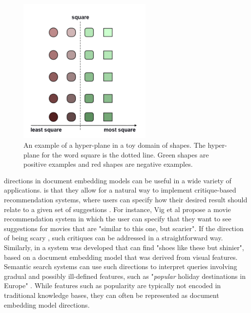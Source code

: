 \begin{figure}[t]
	\includegraphics[width=250px]{images/Toyhyperplane1Direction.png}
	\centering
	\caption{An example of a hyper-plane in a toy domain of shapes. The hyper-plane for the word square is the dotted line. Green shapes are positive examples and red shapes are negative examples. }\label{ch1:introhyp}
\end{figure}

 directions in document embedding models can be useful in a wide variety of applications.   is  that they allow for a natural way to implement critique-based recommendation systems, where users can specify how their desired result should relate to a given set of suggestions \cite{Viappiani2006}. For instance, Vig et al \cite{Vig2014} propose a movie recommendation system in which the user can specify that they want to see suggestions for movies that are "similar to this one, but scarier". If the direction of being scary , such critiques can be addressed in a straightforward way. Similarly, in \cite{Kovashka} a system was developed that can find "shoes like these but shinier", based on a document embedding model that was derived from visual features. Semantic search systems can use such directions to interpret queries involving gradual and possibly ill-defined features, such as "\emph{popular} holiday destinations in Europe" \cite{Jameel}. While features such as popularity are typically not encoded in traditional knowledge bases, they can often be represented as document embedding model directions.%


